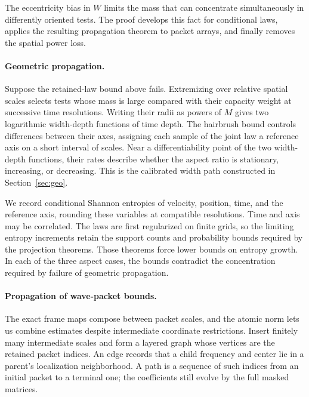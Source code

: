 The eccentricity bias in \(W\) limits the mass that can concentrate
simultaneously in differently oriented tests. The proof develops this
fact for conditional laws, applies the resulting propagation theorem
to packet arrays, and finally removes the spatial power loss.

\paragraph{Geometric propagation.}
Suppose the retained-law bound above fails. Extremizing over relative
spatial scales selects tests whose mass is large compared with their
capacity weight at successive time resolutions. Writing their radii as
powers of \(M\) gives two logarithmic width-depth functions of time
depth. The hairbrush bound
controls differences between their axes, assigning each sample of
the joint law a reference axis on a short interval of scales.
Near a differentiability point of the two width-depth functions, their
rates describe whether the aspect ratio is stationary, increasing,
or decreasing. This is the calibrated width path constructed in
Section~\ref{sec:geo}.

We record conditional Shannon entropies of velocity, position, time,
and the reference axis, rounding these variables at compatible
resolutions. Time and axis may be correlated. The laws are first
regularized on finite grids, so the limiting entropy increments
retain the support counts and probability bounds required by the
projection theorems. Those theorems force lower bounds on entropy
growth. In each of the three aspect cases, the bounds contradict the
concentration required by failure of geometric propagation.

\paragraph{Propagation of wave-packet bounds.}
The exact frame maps compose between packet scales, and the atomic
norm lets us combine estimates despite intermediate coordinate
restrictions. Insert finitely many intermediate scales and form a
layered graph whose vertices are the retained packet indices. An edge
records that a child frequency and center lie in a parent's
localization neighborhood. A path is a sequence of such indices from
an initial packet to a terminal one; the coefficients still evolve
by the full masked matrices.

